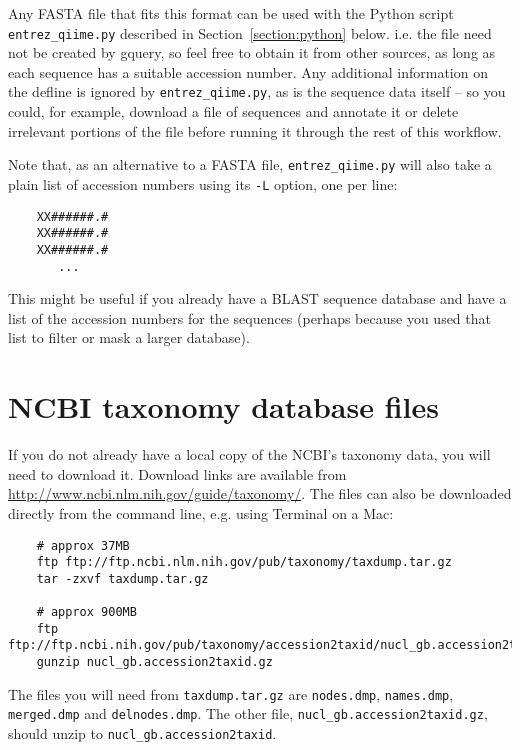 \documentclass[11pt]{amsart}
\begin{document}
Any FASTA file that fits this format can be used with the Python script \verb|entrez_qiime.py| described in Section~\ref{section:python} below. i.e. the file need not be created by gquery, so feel free to obtain it from other sources, as long as each sequence has a suitable accession number. Any additional information on the defline is ignored by \verb|entrez_qiime.py|, as is the sequence data itself -- so you could, for example, download a file of sequences and annotate it or delete irrelevant portions of the file before running it through the rest of this workflow.

Note that, as an alternative to a FASTA file, \verb|entrez_qiime.py| will also take a plain list of accession numbers using its \verb|-L| option, one per line:

\begin{verbatim}
    XX######.#
    XX######.#
    XX######.#
       ...
\end{verbatim}

This might be useful if you already have a BLAST sequence database and have a list of the accession numbers for the sequences (perhaps because you used that list to filter or mask a larger database).

\section{NCBI taxonomy database files}
\label{section:taxonomy}

If you do not already have a local copy of the NCBI's taxonomy data, you will need to download it. Download links are available from \url{http://www.ncbi.nlm.nih.gov/guide/taxonomy/}. The files can also be downloaded directly from the command line, e.g. using Terminal on a Mac:

\begin{verbatim}
    # approx 37MB
    ftp ftp://ftp.ncbi.nlm.nih.gov/pub/taxonomy/taxdump.tar.gz
    tar -zxvf taxdump.tar.gz
    
    # approx 900MB
    ftp ftp://ftp.ncbi.nih.gov/pub/taxonomy/accession2taxid/nucl_gb.accession2taxid.gz
    gunzip nucl_gb.accession2taxid.gz
\end{verbatim}

The files you will need from \verb|taxdump.tar.gz| are \verb|nodes.dmp|, \verb|names.dmp|, \verb|merged.dmp| and \verb|delnodes.dmp|. The other file, \verb|nucl_gb.accession2taxid.gz|, should unzip to \verb|nucl_gb.accession2taxid|.
\end{document}
